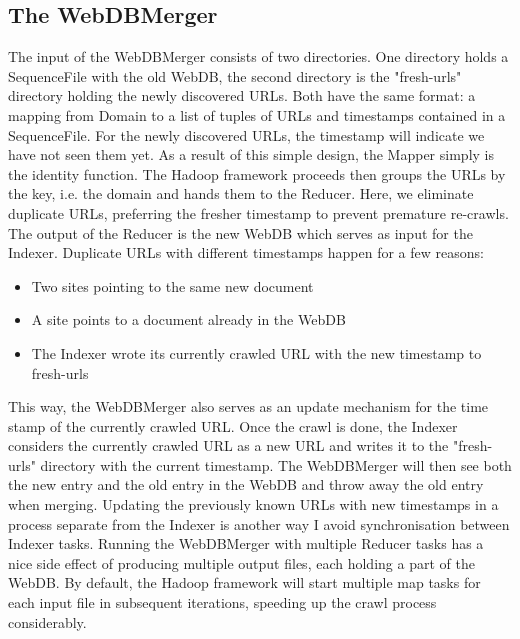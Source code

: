 \documentclass[12pt,a4paper]{report}
\begin{document}
\subsection{The WebDBMerger}
The input of the WebDBMerger consists of two directories. One directory holds a SequenceFile with the old WebDB, the second directory is the "fresh-urls" directory holding the newly
discovered URLs. Both have the same format: a mapping from Domain to a list of tuples of URLs and timestamps contained in a SequenceFile. For the newly discovered URLs,
the timestamp will indicate we have not seen them yet.
As a result of this simple design, the Mapper simply is the identity function. The Hadoop framework proceeds then groups the URLs by the key, i.e. the domain and hands them
to the Reducer. Here, we eliminate duplicate URLs, preferring the fresher timestamp to prevent premature re-crawls. The output of the Reducer is the new WebDB which
serves as input for the Indexer.
Duplicate URLs with different timestamps happen for a few reasons:
\begin{itemize}
\item Two sites pointing to the same new document
\item A site points to a document already in the WebDB
\item The Indexer wrote its currently crawled URL with the new timestamp to fresh-urls
\end{itemize}
This way, the WebDBMerger also serves as an update mechanism for the time stamp of the currently crawled URL. Once the crawl is done,
the Indexer considers the currently crawled URL as a new URL and writes it to the "fresh-urls" directory with the current timestamp.
The WebDBMerger will then see both the new entry and the old entry in the WebDB and throw away the old entry when merging. Updating the
previously known URLs with new timestamps in a process separate from the Indexer is another way I avoid synchronisation between Indexer tasks.
Running the WebDBMerger with multiple Reducer tasks has a nice side effect of producing multiple output files, each holding a part
of the WebDB. By default, the Hadoop framework will start multiple map tasks for each input file in subsequent iterations,
speeding up the crawl process considerably.
\end{document}
